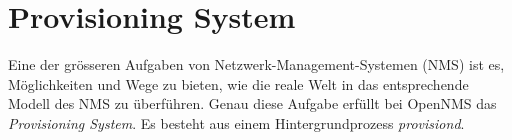 \section{Provisioning System}
Eine der grösseren Aufgaben von Netzwerk-Management-Systemen (NMS) ist es, Möglichkeiten und Wege zu bieten, wie die reale Welt in das entsprechende Modell des NMS zu überführen. Genau diese Aufgabe erfüllt bei OpenNMS das \emph{Provisioning System}. Es besteht aus einem Hintergrundprozess \emph{provisiond}.